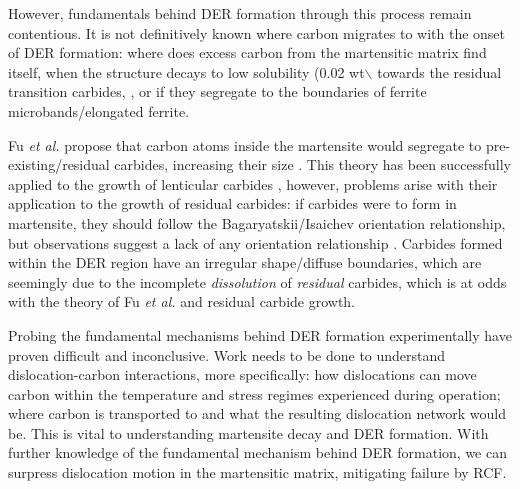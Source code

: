 \documentclass[a4paper,11pt]{article}
\begin{document}
However, fundamentals behind DER formation through this process remain contentious. It is not
definitively known where carbon migrates to with the onset of DER formation: where does excess
carbon from the martensitic matrix find itself, when the structure decays to low solubility
(0.02 wt$\backslash$%
towards the residual transition carbides, \cite{fu17_strain_induc_marten_decay_bearin}, or if they
segregate to the boundaries of ferrite microbands/elongated ferrite.


Fu \emph{et al.} propose that carbon atoms inside the martensite would segregate to
pre-existing/residual carbides, increasing their size
\cite{fu17_strain_induc_marten_decay_bearin}. This theory has been successfully applied to the
growth of lenticular carbides \cite{Fu2017}, however, problems arise with their application to the
growth of residual carbides: if carbides were to form in martensite, they should follow the
Bagaryatskii/Isaichev orientation relationship, but observations suggest a lack of any orientation
relationship \cite{Bhadeshia2018}. Carbides formed within the DER region have an irregular
shape/diffuse boundaries, which are seemingly due to the incomplete \emph{dissolution} of \emph{residual}
carbides, which is at odds with the theory of Fu \emph{et al.} and residual carbide growth.



Probing the fundamental mechanisms behind DER formation experimentally have proven difficult and
inconclusive. Work needs to be done to understand dislocation-carbon interactions, more specifically: how
dislocations can move carbon within the temperature and stress regimes experienced during
operation; where carbon is transported to and what the resulting dislocation network would be. This is vital to
understanding martensite decay and DER formation. With further knowledge of the fundamental
mechanism behind DER formation, we can surpress dislocation motion in the martensitic
matrix, mitigating failure by RCF.
\end{document}
